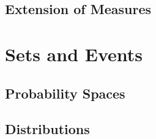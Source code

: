 \documentclass[thmcnt=section, 12pt, color=purple]{my-elegantbook}
\begin{document}

\section{Extension of Measures}


\begin{theorem} \label{thm:1}
\end{theorem}


\chapter{Sets and Events}


\section{Probability Spaces}




\section{Distributions}




\printbibliography[heading=bibintoc, title=References]


\printindex

\end{document}
